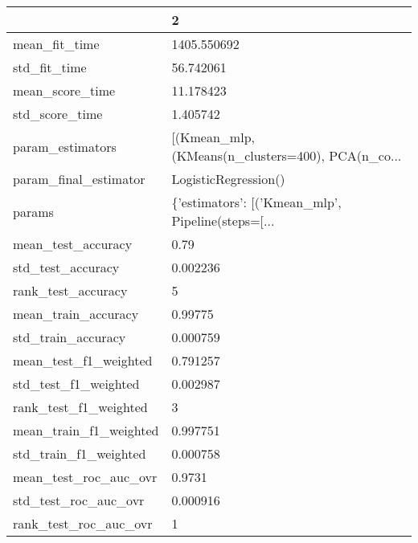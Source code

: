 \begin{tabular}{ll}
\toprule
{} &                                                  2 \\
\midrule
mean\_fit\_time               &                                        1405.550692 \\
std\_fit\_time                &                                          56.742061 \\
mean\_score\_time             &                                          11.178423 \\
std\_score\_time              &                                           1.405742 \\
param\_estimators            &  [(Kmean\_mlp, (KMeans(n\_clusters=400), PCA(n\_co... \\
param\_final\_estimator       &                               LogisticRegression() \\
params                      &  \{'estimators': [('Kmean\_mlp', Pipeline(steps=[... \\
mean\_test\_accuracy          &                                               0.79 \\
std\_test\_accuracy           &                                           0.002236 \\
rank\_test\_accuracy          &                                                  5 \\
mean\_train\_accuracy         &                                            0.99775 \\
std\_train\_accuracy          &                                           0.000759 \\
mean\_test\_f1\_weighted       &                                           0.791257 \\
std\_test\_f1\_weighted        &                                           0.002987 \\
rank\_test\_f1\_weighted       &                                                  3 \\
mean\_train\_f1\_weighted      &                                           0.997751 \\
std\_train\_f1\_weighted       &                                           0.000758 \\
mean\_test\_roc\_auc\_ovr       &                                             0.9731 \\
std\_test\_roc\_auc\_ovr        &                                           0.000916 \\
rank\_test\_roc\_auc\_ovr       &                                                  1 \\

\end{tabular}
